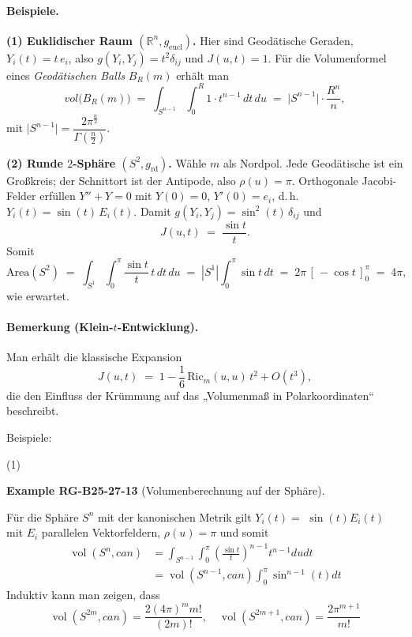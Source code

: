 \documentclass[10pt, letterpaper]{article}
\newcommand{\CustomHeading}[3]{%
  \par\medskip\noindent%
  \textbf{#1 #2} \textnormal{(#3)}.\enskip%
}
\newenvironment{EXA}[2]{\begin{unitbox}\CustomHeading{Example}{#1}{#2}}{\end{unitbox}}
\begin{document}
\paragraph*{Beispiele.}

\textbf{(1) Euklidischer Raum $(\mathbb{R}^n, g_{\mathrm{eucl}})$.}
Hier sind Geodätische Geraden, $Y_i(t)=t\,e_i$, also $g(Y_i,Y_j)=t^2\delta_{ij}$ und $J(u,t)=1$.
Für die Volumenformel eines \emph{Geodätischen Balls} $B_R(m)$ erhält man
\[
  vol\big(B_R(m)\big)
   \;=\;\int_{S^{n-1}}\!\int_{0}^{R} 1\cdot t^{n-1}\,dt\,du
   \;=\;\big|S^{n-1}\big|\cdot \frac{R^n}{n},
\]
mit $\lvert S^{n-1}\rvert=\dfrac{2\pi^{\frac{n}{2}}}{\Gamma(\frac{n}{2})}$.

\medskip
\textbf{(2) Runde $2$-Sphäre $(S^2,g_{\mathrm{rd}})$.}
Wähle $m$ als Nordpol. Jede Geodätische ist ein Großkreis; der Schnittort ist der Antipode, also $\rho(u)=\pi$.
Orthogonale Jacobi-Felder erfüllen $Y''+Y=0$ mit $Y(0)=0$, $Y'(0)=e_i$, d.\,h.\ $Y_i(t)=\sin(t)\,E_i(t)$.
Damit $g(Y_i,Y_j)=\sin^2(t)\,\delta_{ij}$ und
\[
  J(u,t)
  \;=\;\frac{\sin t}{t}.
\]
Somit
\[
  \mathrm{Area}(S^2)
  \;=\;\int_{S^{1}}\!\int_{0}^{\pi} \frac{\sin t}{t}\,t\,dt\,du
  \;=\;|S^{1}|\int_{0}^{\pi}\sin t\,dt
  \;=\;2\pi\,[\,{-}\cos t\,]_{0}^{\pi}
  \;=\;4\pi,
\]
wie erwartet.
\medskip

\paragraph*{Bemerkung (Klein-$t$-Entwicklung).}
Man erhält die klassische Expansion
\[
  J(u,t)\;=\;1-\frac{1}{6}\,\mathrm{Ric}_m(u,u)\,t^2+O(t^3),
\]
die den Einfluss der Krümmung auf das „Volumenmaß in Polarkoordinaten“ beschreibt.


Beispiele:


(1) 


\begin{EXA}{RG-B25-27-13}{Volumenberechnung auf der Sphäre}
Für die Sphäre $S^{n}$ mit der kanonischen Metrik gilt $Y_{i}(t)=$ $\sin (t) E_{i}(t)$ mit $E_{i}$ parallelen Vektorfeldern, $\rho(u)=\pi$ und somit
$$
\begin{aligned}
\operatorname{vol}\left(S^{n}, c a n\right) & =\int_{S^{n-1}} \int_{0}^{\pi}\left(\frac{\sin t}{t}\right)^{n-1} t^{n-1} d u d t \\
& =\operatorname{vol}\left(S^{n-1}, c a n\right) \int_{0}^{\pi} \sin ^{n-1}(t) d t
\end{aligned}
$$
Induktiv kann man zeigen, dass
$$
\operatorname{vol}\left(S^{2 m}, c a n\right)=\frac{2(4 \pi)^{m} m!}{(2 m)!}, \quad \operatorname{vol}\left(S^{2 m+1}, c a n\right)=\frac{2 \pi^{m+1}}{m!}
$$
\end{EXA}
\end{document}
